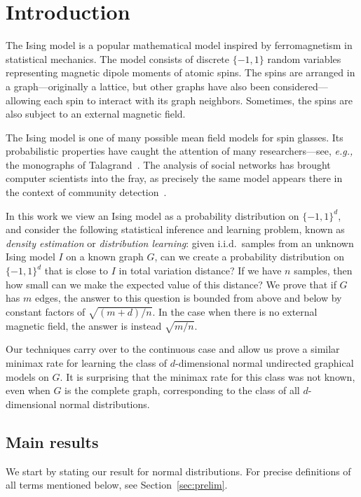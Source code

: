 \documentclass[letterpaper]{amsart}
\makeatletter
\newcommand*{\eg}{\emph{e.g.,}\@\xspace}
\newcommand{\secref}[1]{\mbox{Section~\ref{sec:#1}}}
\numberwithin{thm}{section}
\theoremstyle{definition}
\theoremstyle{plain}
\makeatother
\begin{document}
\section{Introduction}
The Ising model is a popular mathematical model inspired by
ferromagnetism in statistical mechanics.  The model consists of
discrete $\{-1,1\}$ random variables representing magnetic dipole
moments of atomic spins.  The spins are arranged in a
graph---originally a lattice, but other graphs have also been
considered---allowing each spin to interact with its graph
neighbors. Sometimes, the spins are also subject to an external
magnetic field.

The Ising model is one of many possible mean field models for spin
glasses. Its probabilistic properties have caught the attention of
many researchers---see, \eg the monographs of
Talagrand~\cite{talagrand-2003,talagrand-2010,talagrand-2011}. The
analysis of social networks has brought computer scientists into the
fray, as precisely the same model appears there in the context of
community detection~\cite{berthet}.

In this work we view an Ising model as a probability distribution on
$\{-1,1\}^d$, and consider the following statistical inference and
learning problem, known as {\em density estimation} or {\em
  distribution learning}: given i.i.d.\ samples from an unknown Ising
model $I$ on a known graph $G$, can we create a probability
distribution on $\{-1,1\}^d$ that is close to $I$ in total variation
distance?  If we have $n$ samples, then how small can we make the
expected value of this distance? We prove that if $G$ has $m$ edges,
the answer to this question is bounded from above and below by
constant factors of $\sqrt{(m + d)/n}$. In the case when there is no
external magnetic field, the answer is instead $\sqrt{m/n}$.

Our techniques carry over to the continuous case and allow us prove a
similar minimax rate for learning the class of $d$-dimensional normal
undirected graphical models on $G$. It is surprising that the minimax
rate for this class was not known, even when $G$ is the complete
graph, corresponding to the class of all $d$-dimensional normal
distributions.


\subsection{Main results}

We start by stating our result for normal distributions. For precise
definitions of all terms mentioned below, see \secref{prelim}.
\end{document}
